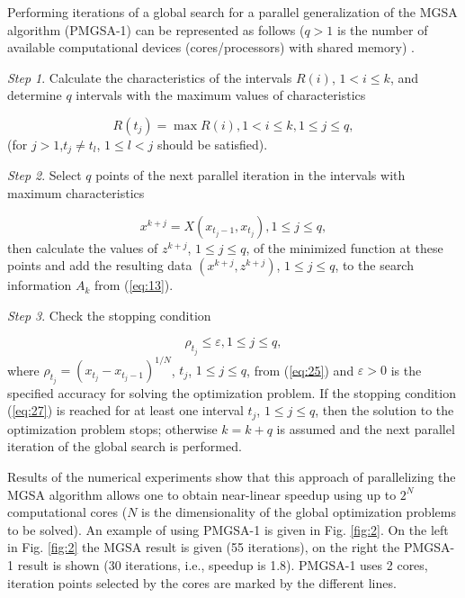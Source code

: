\documentclass[review]{elsarticle}
\begin{document}
Performing iterations of a global search for a parallel generalization of the MGSA algorithm (PMGSA-1) can be represented as follows ($q>1$ is the number of available computational devices (cores/processors) with shared memory) \cite{c33,c34,c32}.

\textit{Step 1}. Calculate the characteristics of the intervals $R(i)$, $1 < i \leq k$, and determine $q$ intervals with the maximum values of characteristics 

\begin{equation}\label{eq:25}
R(t_j)=\max{R(i)},1 < i \leq k, 1 \leq j\leq q,
\end{equation}
(for $j>1$,$t_j \neq t_l$, $1 \leq l < j$ should be satisfied).

\textit{Step 2}. Select $q$ points of the next parallel iteration in the intervals with maximum characteristics

\begin{equation}\label{eq:26}
x^{k+j}=X(x_{t_j-1},x_{t_j} ), 1 \leq j \leq q,
\end{equation}
then calculate the values of $z^{k+j}$, $1 \leq j \leq q$, of the minimized function at these points and add the resulting data $(x^{k+j},z^{k+j})$, $1 \leq j \leq q$, to the search information $A_k$ from (\ref{eq:13}).

\textit{Step 3}. Check the stopping condition

\begin{equation}\label{eq:27}
\rho_{t_j} \leq \varepsilon, 1 \leq j \leq q,
\end{equation}
where $\rho_{t_j}=(x_{t_j}-x_{t_j-1} )^{1/N}$, $t_j$, $1 \leq j \leq q$, from (\ref{eq:25}) and $\varepsilon > 0$ is the specified accuracy for solving the optimization problem. If the stopping condition (\ref{eq:27}) is reached for at least one interval $t_j$, $1 \leq j \leq q$, then the solution to the optimization problem stops; otherwise $k=k+q$ is assumed and the next parallel iteration of the global search is performed. 

Results of the numerical experiments show that this approach of parallelizing the MGSA algorithm allows one to obtain near-linear speedup using up to $2^N$ computational cores ($N$ is the dimensionality of the global optimization problems to be solved). An example of using PMGSA-1 is given in Fig. \ref{fig:2}. On the left in Fig. \ref{fig:2} the MGSA result is given (55 iterations), on the right the PMGSA-1 result is shown (30 iterations, i.e., speedup is 1.8). PMGSA-1 uses 2 cores, iteration points selected by the cores are marked by the different lines.
\end{document}
